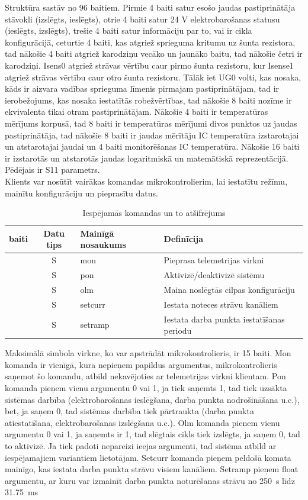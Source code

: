  Struktūra sastāv no 96 baitiem. Pirmie 4 baiti satur esošo jaudas pastiprinātāja stāvokli (izslēgts, ieslēgts), otrie 4 baiti satur 24 V elektrobarošanas statusu (ieslēgts, izslēgts), trešie 4 baiti satur informāciju par to, vai ir cikla konfigurācijā, ceturtie 4 baiti, kas atgriež sprieguma kritumu uz šunta rezistora, tad nākošie 4 baiti atgriež karodziņu vecāko un jaunāko baitu, tad nākošie četri ir karodziņi. Isens0 atgriež strāvas vērtību caur pirmo šunta rezistoru, kur Isense1 atgriež strāvas vērtību caur otro šunta rezistoru. Tālāk iet UG0 volti, kas nosaka, kāds ir aizvara vadības sprieguma līmenis pirmajam pastiprinātājam, tad ir ierobežojums, kas nosaka iestatītās robežvērtības, tad nākošie 8 baiti nozīme ir ekvivalenta tikai otram pastiprinātājam. Nākošie 4 baiti ir temperatūras mērījums korpusā, tad 8 baiti ir temperatūras mērījumi divos punktos uz jaudas pastiprinātāja, tad nākošie 8 baiti ir jaudas mērītāju IC temperatūra izstarotajai un atstarotajai jaudai un 4 baiti monitorēšanas IC temperatūra. Nākošie 16 baiti ir izstarotās un atstarotās jaudas logaritmiskā un matemātiskā reprezentācijā. Pēdējais ir S11 parametrs.\\
 Klients var nosūtīt vairākas komandas mikrokontrolierim, lai iestatītu režīmu, mainītu konfigurāciju un pieprasītu datus.
 \begin{table}[H]
\centering
\captionsetup{singlelinecheck=off, justification=raggedleft}
\caption{Iespējamās komandas un to atšifrējums}
\renewcommand{\arraystretch}{1.2}
\begin{tabular}{|c|c|l|l|}
\hline
\multirow{6}{*}{\centering 15 baiti} & \textbf{Datu tips} & \textbf{Mainīgā nosaukums} & \textbf{Definīcija} \\
\hline
\cline{2-4}
& S    & mon          & Pieprasa telemetrijas virkni \\
\cline{2-4}
& S    & pon          & Aktivizē/deaktivizē sistēmu \\
\cline{2-4}
& S    & olm          & Maina noslēgtās cilpas konfigurāciju \\
\cline{2-4}
& S    & setcurr          & Iestata noteces strāvu kanāliem \\
\cline{2-4}
& S    & setramp          & Iestata darba punkta iestatīšanas periodu \\
\hline
\end{tabular}
\end{table}
Maksimālā simbola virkne, ko var apstrādāt mikrokontrolieris, ir 15 baiti. Mon komanda ir vienīgā, kura nepieņem papildus argumentus, mikrokontrolieris saņemot šo komandu, atbild nekavējoties ar telemetrijas virkni klientam. Pon komanda pieņem vienu argumentu 0 vai 1, ja tiek saņemts 1, tad tiek uzsākta sistēmas darbība (elektrobarošanas ieslēgšana, darba punkta nodrošināšana u.c.), bet, ja saņem 0, tad sistēmas darbība tiek pārtraukta (darba punkta atiestatīšana, elektrobarošanas izslēgšana u.c.). Olm komanda pieņem vienu argumentu 0 vai 1, ja saņemts ir 1, tad slēgtais cikls tiek izslēgts, ja saņem 0, tad to aktivizē. Ja tiek padoti nepareizi ieejas argumenti, tad sistēma atbild ar iespējamajiem variantiem lietotājam. Setcurr komanda pieņem peldošā komata mainīgo, kas iestata darba punkta strāvu visiem kanāliem. Setramp pieņem float argumentu, ar kuru var izmainīt darba punkta noturēšanas strāvu no 250~\textmu s līdz 31.75~ms
